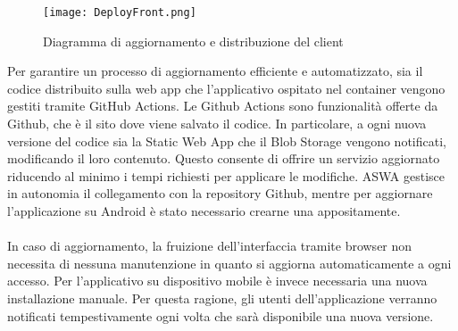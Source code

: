 \begin{figure}[h!]
    \begin{center}
        \texttt{[image: DeployFront.png]}
        \caption{Diagramma di aggiornamento e distribuzione del client}
    \end{center}
\end{figure}

Per garantire un processo di aggiornamento efficiente e automatizzato,
sia il codice distribuito sulla web app che l'applicativo ospitato nel container 
vengono gestiti tramite GitHub Actions.
Le Github Actions sono funzionalità offerte da Github, 
che è il sito dove viene salvato il codice.
In particolare, a ogni nuova versione del codice sia la Static Web App che il Blob Storage vengono notificati,
modificando il loro contenuto.
Questo consente di offrire un servizio aggiornato 
riducendo al minimo i tempi richiesti per applicare le modifiche. 
ASWA gestisce in autonomia il collegamento con la repository Github, 
mentre per aggiornare l'applicazione su Android è stato necessario crearne una appositamente.\\
\\
In caso di aggiornamento, 
la fruizione dell'interfaccia tramite browser non necessita di nessuna manutenzione 
in quanto si aggiorna automaticamente a ogni accesso.
Per l'applicativo su dispositivo mobile è invece necessaria una nuova installazione manuale.
Per questa ragione, gli utenti dell'applicazione verranno notificati tempestivamente 
ogni volta che sarà disponibile una nuova versione.
\clearpage
